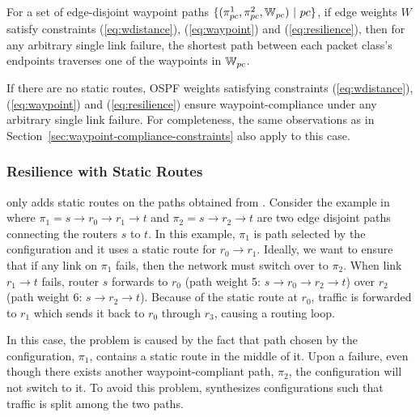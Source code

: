 \iffull
\begin{theorem}
	For a set of edge-disjoint waypoint paths $\{(\pi^1_{pc}, \pi^2_{pc}, \mathbb{W}_{pc}) ~|~ pc\}$, 
	if edge weights $W$ satisfy constraints (\ref{eq:wdistance}), (\ref{eq:waypoint}) and
	(\ref{eq:resilience}), 
	then for any arbitrary single link failure, 
	the shortest path between each packet class's 
	endpoints traverses one of the waypoints in $\mathbb{W}_{pc}$.
\end{theorem}

\fi

If there are no static routes, OSPF weights satisfying constraints 
(\ref{eq:wdistance}), (\ref{eq:waypoint}) and (\ref{eq:resilience}) ensure
waypoint-compliance under any arbitrary single link failure. For completeness, 
the same observations as in Section~\ref{sec:waypoint-compliance-constraints}
also apply to this case.  


\subsubsection{Resilience with Static Routes} \hspace*{4mm}


\name only adds static routes on the paths obtained from \genesis.
Consider the example in  where 
$\pi_1=s\rightarrow r_0 \rightarrow r_1 \rightarrow t$ 
and $\pi_2=s\rightarrow r_2 \rightarrow t$ 
are two edge disjoint paths 
connecting the routers $s$ to $t$. In this example, 
$\pi_1$ is path selected by the configuration and it uses a static route
for $r_0 \rightarrow r_1$. 
Ideally, we want to ensure 
that if any link on $\pi_1$ fails, 
then the network must switch over to $\pi_2$. 
When link $r_1 \rightarrow t$ fails,
router $s$ forwards to $r_0$ (path weight 5: $ s \rightarrow r_0 \rightarrow r_2 \rightarrow t$)
over $r_2$ (path weight 6: $s \rightarrow r_2 \rightarrow t$). 
Because of the static route at $r_0$, traffic is forwarded
to $r_1$ which sends it back to $r_0$ through $r_3$, 
causing a routing loop. 


In this case, the problem is caused by the fact that
path chosen by the configuration, $\pi_1$,
contains a static route in the middle of it.
Upon a failure, even though there exists another
waypoint-compliant path, $\pi_2$, the configuration will not switch to it.
To avoid this problem, 
\name synthesizes 
configurations such that traffic is split among the two paths.

